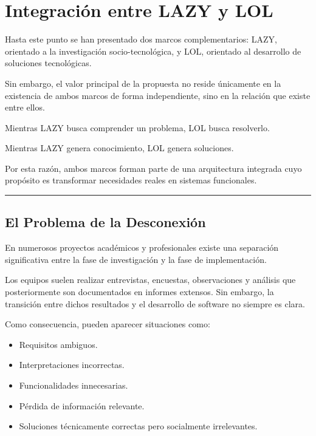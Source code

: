 \documentclass[14pt,a4paper,oneside]{extbook}
\begin{document}
\chapter{Integración entre LAZY y LOL}


Hasta este punto se han presentado dos marcos complementarios: LAZY, orientado a la investigación socio-tecnológica, y LOL, orientado al desarrollo de soluciones tecnológicas.

Sin embargo, el valor principal de la propuesta no reside únicamente en la existencia de ambos marcos de forma independiente, sino en la relación que existe entre ellos.

Mientras LAZY busca comprender un problema, LOL busca resolverlo.

Mientras LAZY genera conocimiento, LOL genera soluciones.

Por esta razón, ambos marcos forman parte de una arquitectura integrada cuyo propósito es transformar necesidades reales en sistemas funcionales.

\par\vspace{1.5em}\noindent\hfill\rule{0.25\textwidth}{0.6pt}\hfill\par\vspace{1.5em}

\section{El Problema de la Desconexión}

En numerosos proyectos académicos y profesionales existe una separación significativa entre la fase de investigación y la fase de implementación.

Los equipos suelen realizar entrevistas, encuestas, observaciones y análisis que posteriormente son documentados en informes extensos. Sin embargo, la transición entre dichos resultados y el desarrollo de software no siempre es clara.

Como consecuencia, pueden aparecer situaciones como:

\begin{itemize}
\item Requisitos ambiguos.
\item Interpretaciones incorrectas.
\item Funcionalidades innecesarias.
\item Pérdida de información relevante.
\item Soluciones técnicamente correctas pero socialmente irrelevantes.
\end{itemize}
\end{document}
